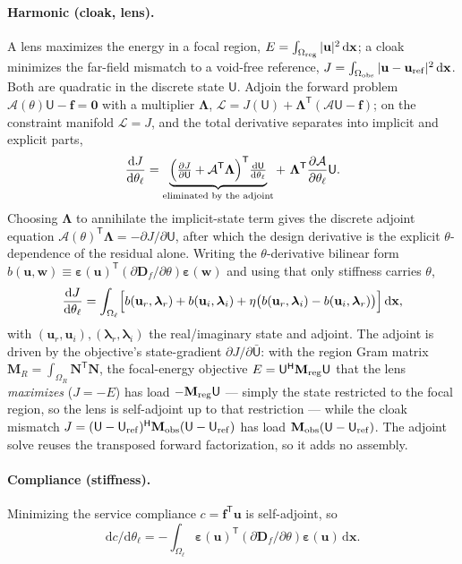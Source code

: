 \documentclass[preprint,11pt]{elsarticle}
\newcommand{\vu}{\mathbf{u}}
\newcommand{\vU}{\mathsf{U}}
\newcommand{\vx}{\mathbf{x}}
\newcommand{\vf}{\mathbf{f}}
\newcommand{\vw}{\mathbf{w}}
\newcommand{\veps}{\bm{\varepsilon}}
\newcommand{\Tp}{^{\mathsf{T}}}
\newcommand{\Hp}{^{\mathsf{H}}}
\newcommand{\rmd}{\mathrm{d}}
\newcommand{\Df}{\mathbf{D}_f}
\newcommand{\Mmat}{\mathbf{M}}
\theoremstyle{plain}\newtheorem{proposition}{Proposition}
\theoremstyle{remark}\newtheorem{remark}{Remark}
\begin{document}
\paragraph{Harmonic (cloak, lens).} A lens maximizes the energy in a focal region,
$E=\int_{\Omega_{\rm reg}}|\vu|^2\,\rmd\vx$; a cloak minimizes the far-field mismatch to a void-free
reference, $J=\int_{\Omega_{\rm obs}}|\vu-\vu_{\rm ref}|^2\,\rmd\vx$. Both are quadratic in the
discrete state $\vU$. Adjoin the forward problem $\mathcal A(\theta)\vU-\vf=\mathbf 0$ with
a multiplier $\bm\Lambda$, $\mathcal L=J(\vU)+\bm\Lambda\Tp(\mathcal A\vU-\vf)$; on the
constraint manifold $\mathcal L=J$, and the total derivative separates into implicit and
explicit parts,
\begin{equation}
  \frac{\rmd J}{\rmd\theta_\ell}
  =\underbrace{\Bigl(\tfrac{\partial J}{\partial\vU}+\mathcal A\Tp\bm\Lambda\Bigr)\Tp
  \tfrac{\rmd\vU}{\rmd\theta_\ell}}_{\text{eliminated by the adjoint}}
  +\ \bm\Lambda\Tp\frac{\partial\mathcal A}{\partial\theta_\ell}\vU .
  \label{eq:lagr}
\end{equation}
Choosing $\bm\Lambda$ to annihilate the implicit-state term gives the discrete adjoint
equation $\mathcal A(\theta)\Tp\bm\Lambda=-\partial J/\partial\vU$, after which the design
derivative is the explicit $\theta$-dependence of the residual alone. Writing the
$\theta$-derivative bilinear form $b(\vu,\vw)\equiv\veps(\vu)\Tp(\partial\Df/\partial\theta)
\veps(\vw)$ and using that only stiffness carries $\theta$,
\begin{equation}
  \frac{\rmd J}{\rmd\theta_\ell}=\int_{\Omega_\ell}\Bigl[
  b(\vu_r,\bm\lambda_r)+b(\vu_i,\bm\lambda_i)
  +\eta\bigl(b(\vu_r,\bm\lambda_i)-b(\vu_i,\bm\lambda_r)\bigr)\Bigr]\,\rmd\vx,
  \label{eq:sensharm}
\end{equation}
with $(\vu_r,\vu_i),(\bm\lambda_r,\bm\lambda_i)$ the real/imaginary state and adjoint. The
adjoint is driven by the objective's state-gradient $\partial J/\partial\bar{\vU}$: with the
region Gram matrix $\Mmat_R=\int_{\Omega_R}\mathbf N\Tp\mathbf N$, the focal-energy objective
$E=\vU\Hp\Mmat_{\rm reg}\vU$ that the lens \emph{maximizes} ($J=-E$) has load
$-\Mmat_{\rm reg}\vU$ --- simply the state restricted to the focal region, so the lens is
self-adjoint up to that restriction --- while the cloak mismatch $J=(\vU-\vU_{\rm ref})\Hp
\Mmat_{\rm obs}(\vU-\vU_{\rm ref})$ has load $\Mmat_{\rm obs}(\vU-\vU_{\rm ref})$. The adjoint
solve reuses the transposed forward factorization, so it adds no assembly.

\paragraph{Compliance (stiffness).} Minimizing the service compliance $c=\vf\Tp\vu$ is
self-adjoint, so
\[
  \rmd c/\rmd\theta_\ell=-\int_{\Omega_\ell}\veps(\vu)\Tp(\partial\Df/\partial\theta)
  \veps(\vu)\,\rmd\vx .
\]
\end{document}
